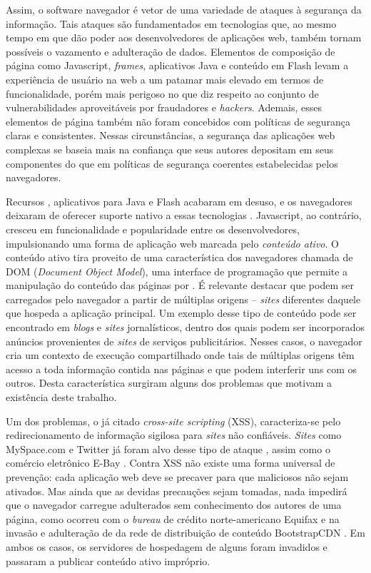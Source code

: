 Assim, o software navegador é vetor de uma variedade de ataques à segurança da informação. Tais ataques são fundamentados em tecnologias que, ao mesmo tempo em que dão poder aos desenvolvedores de aplicações web, também tornam possíveis o vazamento e adulteração de dados. Elementos de composição de página como Javascript, \textit{frames}, aplicativos Java e conteúdo em Flash levam a experiência de usuário na web a um patamar mais elevado em termos de funcionalidade, porém mais perigoso no que diz respeito ao conjunto de vulnerabilidades aproveitáveis por fraudadores e \textit{hackers}. Ademais, esses elementos de página também não foram concebidos com políticas de segurança claras e consistentes. Nessas circunstâncias, a segurança das aplicações web complexas se baseia mais na confiança que seus autores depositam em seus componentes do que em políticas de segurança coerentes estabelecidas pelos navegadores.

Recursos , aplicativos para Java e Flash acabaram em desuso, e os navegadores deixaram de oferecer suporte nativo a essas tecnologias \cite{Verge2016, Adobe2017}. Javascript, ao contrário, cresceu em funcionalidade e popularidade entre os desenvolvedores, impulsionando uma forma de aplicação web marcada pelo \textit{conteúdo ativo}. O conteúdo ativo tira proveito de uma característica dos navegadores chamada de DOM (\textit{Document Object Model}), uma interface de programação que permite a manipulação do conteúdo das páginas por {\scripts}. É relevante destacar que \scripts{} podem ser carregados pelo navegador a partir de múltiplas origens -- \textit{sites} diferentes daquele que hospeda a aplicação principal. Um exemplo desse tipo de conteúdo pode ser encontrado em \textit{blogs} e \textit{sites} jornalísticos, dentro dos quais podem ser incorporados anúncios provenientes de \textit{sites} de serviços publicitários. Nesses casos, o navegador cria um contexto de execução compartilhado onde tais {\scripts} de múltiplas origens têm acesso a toda informação contida nas páginas e que podem interferir uns com os outros. Desta característica surgiram alguns dos problemas que motivam a existência deste trabalho.

Um dos problemas, o já citado \textit{cross-site scripting} (XSS), caracteriza-se pelo redirecionamento de informação sigilosa para \textit{sites} não confiáveis. \textit{Sites} como MySpace.com e Twitter já foram alvo desse tipo de ataque \cite{IBM2017}, assim como o comércio eletrônico E-Bay \cite{Vanunu2016}. Contra XSS não existe uma forma universal de prevenção: cada aplicação web deve se precaver para que {\scripts} maliciosos não sejam ativados. Mas ainda que as devidas precauções sejam tomadas, nada impedirá que o navegador carregue {\scripts} adulterados sem conhecimento dos autores de uma página, como ocorreu com o \textit{bureau} de crédito norte-americano Equifax \cite{Segura2017} e na invasão e adulteração de {\scripts} da rede de distribuição de conteúdo BootstrapCDN \cite{Dorfman2013}. Em ambos os casos, os servidores de hospedagem de alguns {\scripts} foram invadidos e passaram a publicar conteúdo ativo impróprio. %

